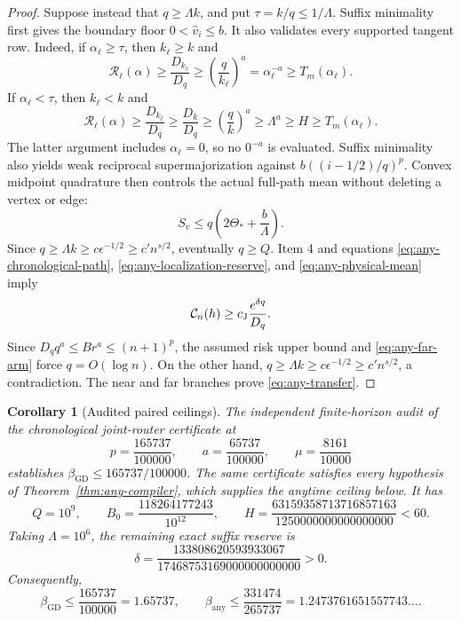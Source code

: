 \documentclass[11pt]{article}
\newtheorem{corollary}[theorem]{Corollary}
\theoremstyle{definition}
\theoremstyle{remark}
\newcommand{\gdexp}{\beta_{\mathrm{GD}}}
\newcommand{\anyexp}{\beta_{\mathrm{any}}}
\begin{document}
\begin{proof}
Suppose instead that \(q\ge\Lambda k\), and put
\(\tau=k/q\le1/\Lambda\).  Suffix minimality first gives the boundary floor
\(0<\widehat v_i\le b\).  It also validates every supported tangent row.
Indeed, if \(\alpha_\ell\ge\tau\), then \(k_\ell\ge k\) and
\[
 \mathscr R_\ell(\alpha)\ge\frac{D_{k_\ell}}{D_q}
 \ge\left(\frac q{k_\ell}\right)^a
 =\alpha_\ell^{-a}\ge T_m(\alpha_\ell).
\]
If \(\alpha_\ell<\tau\), then \(k_\ell<k\) and
\[
 \mathscr R_\ell(\alpha)\ge\frac{D_{k_\ell}}{D_q}
 \ge\frac{D_k}{D_q}\ge\left(\frac qk\right)^a
 \ge\Lambda^a\ge H\ge T_m(\alpha_\ell).
\]
The latter argument includes \(\alpha_\ell=0\), so no \(0^{-a}\) is
evaluated.  Suffix minimality also yields weak reciprocal supermajorization
against \(b((i-1/2)/q)^p\).  Convex midpoint quadrature then controls the
actual full-path mean without deleting a vertex or edge:
\begin{equation}
 S_v\le q\left(2\Theta_*+\frac b\Lambda\right).
 \label{eq:any-physical-mean}
\end{equation}
Since \(q\ge\Lambda k\ge c\epsilon^{-1/2}\ge c'n^{s/2}\), eventually
\(q\ge Q\).  Item 4 and equations \eqref{eq:any-chronological-path},
\eqref{eq:any-localization-reserve}, and \eqref{eq:any-physical-mean} imply
\begin{equation}
 \mathcal C_n(h)\ge c_{\rm J}\frac{e^{\delta q}}{D_q}.
 \label{eq:any-far-arm}
\end{equation}
Since \(D_qq^a\le Br^a\le(n+1)^p\), the assumed risk upper bound and
\eqref{eq:any-far-arm} force \(q=O(\log n)\).  On the other hand,
\(q\ge\Lambda k\ge c\epsilon^{-1/2}\ge c'n^{s/2}\), a contradiction.
The near and far branches prove \eqref{eq:any-transfer}.
\end{proof}

\begin{corollary}[Audited paired ceilings]
\label{cor:any-instantiation}
The independent finite-horizon audit of the chronological joint-router
certificate at
\[
 p=\frac{165737}{100000},\qquad
 a=\frac{65737}{100000},\qquad
 \mu=\frac{8161}{10000}
\]
establishes \(\gdexp\le165737/100000\).  The same certificate satisfies
every hypothesis of Theorem~\ref{thm:any-compiler}, which supplies the
anytime ceiling below.  It has
\[
 Q=10^9,\qquad
 B_0=\frac{118264177243}{10^{12}},\qquad
 H=\frac{63159358713716857163}{1250000000000000000}<60.
\]
Taking \(\Lambda=10^6\), the remaining exact suffix reserve is
\[
 \delta=
 \frac{133808620593933067}
 {17468753169000000000000}>0.
\]
Consequently,
\begin{equation}
 \boxed{
 \gdexp\le\frac{165737}{100000}=1.65737,
 \qquad
 \anyexp\le\frac{331474}{265737}
 =1.2473761651557743\ldots .}
 \label{eq:any-paired-result}
\end{equation}
\end{corollary}
\end{document}
